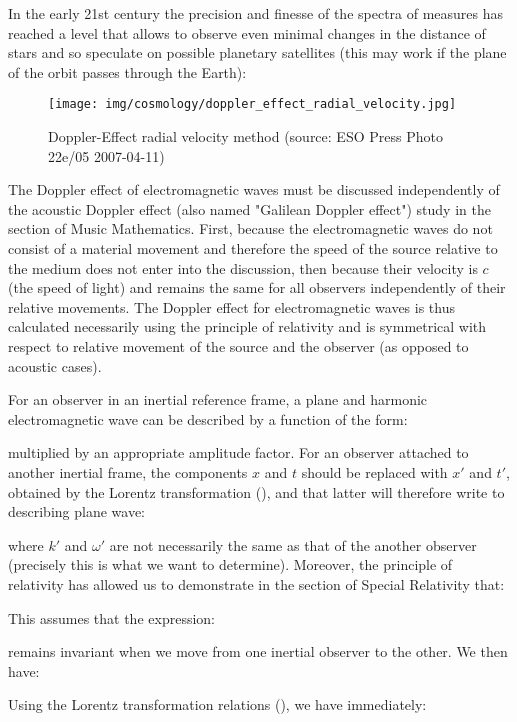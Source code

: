 	In the early 21st century the precision and finesse of the spectra of measures has reached a level that allows to observe even minimal changes in the distance of stars and so speculate on possible planetary satellites (this may work if the plane of the orbit passes through the Earth):
	\begin{figure}[H]
		\begin{center}
		\texttt{[image: img/cosmology/doppler\_effect\_radial\_velocity.jpg]}
		\end{center}	
		\caption[Doppler-Effect radial velocity method]{Doppler-Effect radial velocity method (source: ESO Press Photo 22e/05 2007-04-11)}
	\end{figure}
	The Doppler effect of electromagnetic waves must be discussed independently of the acoustic Doppler effect (also named "Galilean Doppler effect") study in the section of Music Mathematics. First, because the electromagnetic waves do not consist of a material movement and therefore the speed of the source relative to the medium does not enter into the discussion, then because their velocity is $c$ (the speed of light) and remains the same for all observers independently of their relative movements. The Doppler effect for electromagnetic waves is thus calculated necessarily using the principle of relativity and is symmetrical with respect to relative movement of the source and the observer (as opposed to acoustic cases).
	
	For an observer in an inertial reference frame, a plane and harmonic electromagnetic wave can be described by a function of the form:
	
	multiplied by an appropriate amplitude factor. For an observer attached to another inertial frame, the components $x$ and $t$ should be replaced with $x'$ and $t'$, obtained by the Lorentz transformation (), and that latter will therefore write to describing plane wave:
	
	where $k'$ and $\omega'$ are not necessarily the same as that of the another observer (precisely this is what we want to determine). Moreover, the principle of relativity has allowed us to demonstrate in the section of Special Relativity that:
	
	This assumes that the expression:
	
	remains invariant when we move from one inertial observer to the other. We then have:
	
	Using the Lorentz transformation relations (), we have immediately:
	
